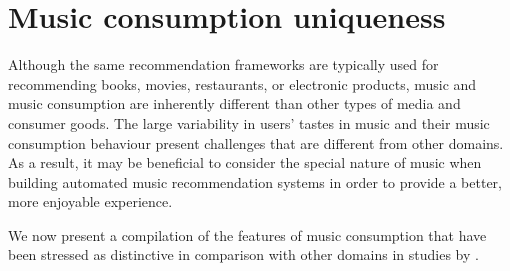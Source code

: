 \section{Music consumption uniqueness}
Although the same recommendation frameworks are typically used for recommending books, movies, restaurants, or electronic products, music and music consumption are inherently different than other types of media and consumer goods. %
The large variability in users' tastes in music and their music consumption behaviour present challenges that are different from other domains. As a result, it may be beneficial to consider the special nature of music when building automated music recommendation systems in order to provide a better, more enjoyable experience.

We now present a compilation of the features of music consumption that have been stressed as distinctive in comparison with other domains in studies by \textcite{denora00music, north04uses, casey08content, jones08user, park10temporal, celma10music, baur11thesis, celma11tutorial, song12survey, zhang13understanding, margulis13onrepeat}.


